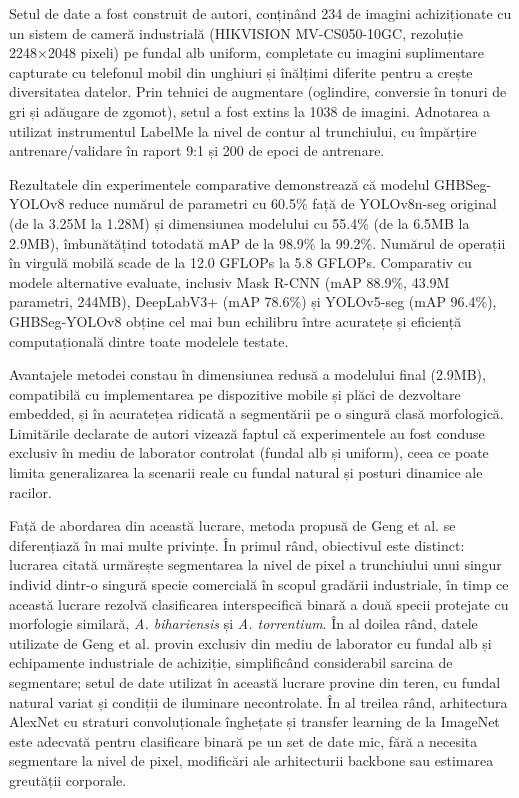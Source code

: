 Setul de date a fost construit de autori, conținând 234 de imagini achiziționate cu un sistem de cameră industrială (HIKVISION MV-CS050-10GC, rezoluție 2248×2048 pixeli) pe fundal alb uniform, completate cu imagini suplimentare capturate cu telefonul mobil din unghiuri și înălțimi diferite pentru a crește diversitatea datelor. Prin tehnici de augmentare (oglindire, conversie în tonuri de gri și adăugare de zgomot), setul a fost extins la 1038 de imagini. Adnotarea a utilizat instrumentul LabelMe la nivel de contur al trunchiului, cu împărțire antrenare/validare în raport 9:1 și 200 de epoci de antrenare.

Rezultatele din experimentele comparative demonstrează că modelul GHBSeg-YOLOv8 reduce numărul de parametri cu 60.5\% față de YOLOv8n-seg original (de la 3.25M la 1.28M) și dimensiunea modelului cu 55.4\% (de la 6.5MB la 2.9MB), îmbunătățind totodată mAP de la 98.9\% la 99.2\%. Numărul de operații în virgulă mobilă scade de la 12.0 GFLOPs la 5.8 GFLOPs. Comparativ cu modele alternative evaluate, inclusiv Mask R-CNN (mAP 88.9\%, 43.9M parametri, 244MB), DeepLabV3+ (mAP 78.6\%) și YOLOv5-seg (mAP 96.4\%), GHBSeg-YOLOv8 obține cel mai bun echilibru între acuratețe și eficiență computațională dintre toate modelele testate.

Avantajele metodei constau în dimensiunea redusă a modelului final (2.9MB), compatibilă cu implementarea pe dispozitive mobile și plăci de dezvoltare embedded, și în acuratețea ridicată a segmentării pe o singură clasă morfologică. Limitările declarate de autori vizează faptul că experimentele au fost conduse exclusiv în mediu de laborator controlat (fundal alb și uniform), ceea ce poate limita generalizarea la scenarii reale cu fundal natural și posturi dinamice ale racilor.

Față de abordarea din această lucrare, metoda propusă de Geng et al. \cite{Application_of_Improved_YOLOv8n-seg_in_Crayfish_Trunk_Segmentation} se diferențiază în mai multe privințe. În primul rând, obiectivul este distinct: lucrarea citată urmărește segmentarea la nivel de pixel a trunchiului unui singur individ dintr-o singură specie comercială în scopul gradării industriale, în timp ce această lucrare rezolvă clasificarea interspecifică binară a două specii protejate cu morfologie similară, \textit{A. bihariensis} și \textit{A. torrentium}. În al doilea rând, datele utilizate de Geng et al. provin exclusiv din mediu de laborator cu fundal alb și echipamente industriale de achiziție, simplificând considerabil sarcina de segmentare; setul de date utilizat în această lucrare provine din teren, cu fundal natural variat și condiții de iluminare necontrolate. În al treilea rând, arhitectura AlexNet cu straturi convoluționale înghețate și transfer learning de la ImageNet este adecvată pentru clasificare binară pe un set de date mic, fără a necesita segmentare la nivel de pixel, modificări ale arhitecturii backbone sau estimarea greutății corporale.

